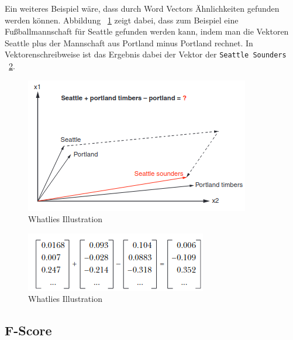 Ein weiteres Beispiel wäre, dass durch Word Vectors Ähnlichkeiten gefunden werden können.
Abbildung ~\ref{fig:geometry-word2vec} zeigt dabei, dass zum Beispiel eine Fußballmannschaft für Seattle gefunden werden kann, indem man die Vektoren Seattle plus der Mannschaft aus Portland minus Portland rechnet.
In Vektorenschreibweise ist das Ergebnis dabei der Vektor der \texttt{Seattle Sounders} ~\ref{fig:compute-word2vec}.\cite{nlpInAction}

\begin{figure}[hbt!]
    \centering
    \includegraphics[scale=1]{pics/geometry-word2vec}
    \caption{Whatlies Illustration~\cite{whatlies}}
    \label{fig:geometry-word2vec}
\end{figure}

\begin{figure}[hbt!]
    \centering
    \includegraphics[scale=1]{pics/compute-word2vec}
    \caption{Whatlies Illustration~\cite{whatlies}}
    \label{fig:compute-word2vec}
\end{figure}


\subsection{F-Score}\label{F-Score}

